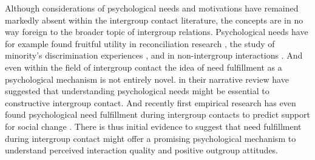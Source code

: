 \documentclass[man, 12pt, a4paper, mask]{apa7}
\theoremstyle{break}
\theoremstyle{plain}
\begin{document}


Although considerations of psychological needs and motivations have remained markedly absent within the intergroup contact literature, the concepts are in no way foreign to the broader topic of intergroup relations. Psychological needs have for example found fruitful utility in reconciliation research \citep[][]{Shnabel2008}, the study of minority's discrimination experiences \citep[][]{Celebi2017}, and in non-intergroup interactions \citep[][]{Downie2008}. 
And even within the field of intergroup contact the idea of need fulfillment as a psychological mechanism is not entirely novel. \citet{Dovidio2017} in their narrative review have suggested that understanding psychological needs might be essential to constructive intergroup contact. And recently first empirical research has even found psychological need fulfillment during intergroup contacts to predict support for social change \citep[][]{Hassler2021}. There is thus initial evidence to suggest that need fulfillment during intergroup contact might offer a promising psychological mechanism to understand perceived interaction quality and positive outgroup attitudes. 
\end{document}
